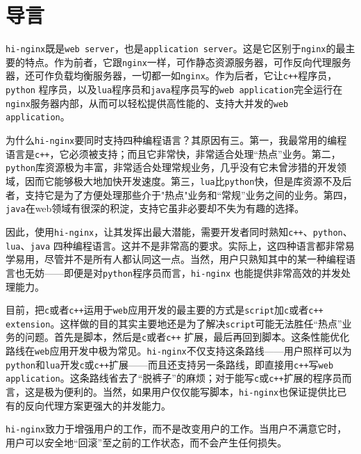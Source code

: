 \section{导言}
\texttt{hi-nginx}既是\texttt{web server}，也是\texttt{application server}。这是它区别于\texttt{nginx}的最主要的特点。作为前者，它跟\texttt{nginx}一样，可作静态资源服务器，可作反向代理服务器，还可作负载均衡服务器，一切都一如\texttt{nginx}。作为后者，它让\texttt{c++}程序员，\texttt{python} 程序员，以及\texttt{lua}程序员和\texttt{java}程序员写的\texttt{web application}完全运行在\texttt{nginx}服务器内部，从而可以轻松提供高性能的、支持大并发的\texttt{web application}。

为什么\texttt{hi-nginx}要同时支持四种编程语言？其原因有三。第一，我最常用的编程语言是\texttt{c++}，它必须被支持；而且它非常快，非常适合处理“热点”业务。第二，\texttt{python}库资源极为丰富，非常适合处理常规业务，几乎没有它未曾涉猎的开发领域，因而它能够极大地加快开发速度。第三，\texttt{lua}比\texttt{python}快，但是库资源不及后者，支持它是为了方便处理那些介于"热点"业务和“常规”业务之间的业务。第四，\texttt{java}在web领域有很深的积淀，支持它虽非必要却不失为有趣的选择。

因此，使用\texttt{hi-nginx}，让其发挥出最大潜能，需要开发者同时熟知\texttt{c++}、\texttt{python}、\texttt{lua}、\texttt{java} 四种编程语言。这并不是非常高的要求。实际上，这四种语言都非常易学易用，尽管并不是所有人都认同这一点。当然，用户只熟知其中的某一种编程语言也无妨——即便是对\texttt{python}程序员而言，\texttt{hi-nginx}	也能提供非常高效的并发处理能力。

目前，把\texttt{c}或者\texttt{c++}运用于\texttt{web}应用开发的最主要的方式是\texttt{script}加\texttt{c}或者\texttt{c++} \texttt{extension}。这样做的目的其实主要地还是为了解决\texttt{script}可能无法胜任“热点”业务的问题。首先是脚本，然后是\texttt{c}或者\texttt{c++} 扩展，最后再回到脚本。这条性能优化路线在\texttt{web}应用开发中极为常见。\texttt{hi-nginx}不仅支持这条路线——用户照样可以为\texttt{python}和\texttt{lua}开发\texttt{c}或\texttt{c++}扩展——而且还支持另一条路线，即直接用\texttt{c++}写\texttt{web application}。这条路线省去了“脱裤子”的麻烦；对于能写\texttt{c}或\texttt{c++}扩展的程序员而言，这是极为便利的。当然，如果用户仅仅能写脚本，\texttt{hi-nginx}也保证提供比已有的反向代理方案更强大的并发能力。

\texttt{hi-nginx}致力于增强用户的工作，而不是改变用户的工作。当用户不满意它时，用户可以安全地“回滚”至之前的工作状态，而不会产生任何损失。